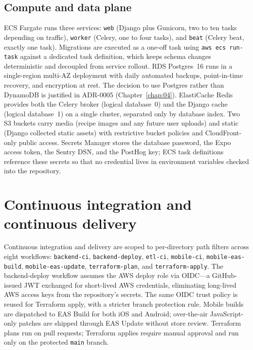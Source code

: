 \subsection{Compute and data plane}

ECS Fargate runs three services: \texttt{web} (Django plus Gunicorn, two to ten tasks depending on traffic), \texttt{worker} (Celery, one to four tasks), and \texttt{beat} (Celery beat, exactly one task). Migrations are executed as a one-off task using \texttt{aws ecs run-task} against a dedicated task definition, which keeps schema changes deterministic and decoupled from service rollout. RDS Postgres~16 runs in a single-region multi-AZ deployment with daily automated backups, point-in-time recovery, and encryption at rest. The decision to use Postgres rather than DynamoDB is justified in ADR-0005 (Chapter~\ref{chap:04}). ElastiCache Redis provides both the Celery broker (logical database~0) and the Django cache (logical database~1) on a single cluster, separated only by database index. Two S3 buckets carry media (recipe images and any future user uploads) and static (Django collected static assets) with restrictive bucket policies and CloudFront-only public access. Secrets Manager stores the database password, the Expo access token, the Sentry DSN, and the PostHog key; ECS task definitions reference these secrets so that no credential lives in environment variables checked into the repository.

\section{Continuous integration and continuous delivery}

Continuous integration and delivery are scoped to per-directory path filters across eight workflows: \texttt{backend-ci}, \texttt{backend-deploy}, \texttt{etl-ci}, \texttt{mobile-ci}, \texttt{mobile-eas-build}, \texttt{mobile-eas-update}, \texttt{terraform-plan}, and \texttt{terraform-apply}. The backend-deploy workflow assumes the AWS deploy role via OIDC---a GitHub-issued JWT exchanged for short-lived AWS credentials, eliminating long-lived AWS access keys from the repository's secrets. The same OIDC trust policy is reused for Terraform apply, with a stricter branch protection rule. Mobile builds are dispatched to EAS Build for both iOS and Android; over-the-air JavaScript-only patches are shipped through EAS Update without store review. Terraform plans run on pull requests; Terraform applies require manual approval and run only on the protected \texttt{main} branch.

